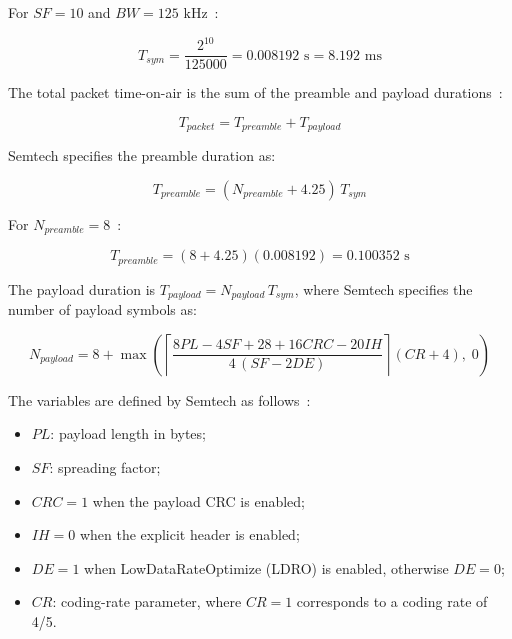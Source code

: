 For \(SF = 10\) and \(BW = 125\text{ kHz}\)~\cite{semtech2020sx1276}:

\begin{equation}
T_{sym} = \frac{2^{10}}{125000} = 0.008192\text{ s} = 8.192\text{ ms}
\label{eq:symbol-time-value}
\end{equation}

The total packet time-on-air is the sum of the preamble and payload durations~\cite[Sec.~4.1.1.7, p.~31]{semtech2020sx1276}:

\begin{equation}
T_{packet} = T_{preamble} + T_{payload}
\label{eq:packet-airtime}
\end{equation}

Semtech specifies the preamble duration as:

\begin{equation}
T_{preamble} = (N_{preamble} + 4.25)\,T_{sym}
\label{eq:preamble-duration}
\end{equation}

For \(N_{preamble} = 8\)~\cite{semtech2020sx1276}:

\begin{equation}
T_{preamble} = (8 + 4.25)(0.008192) = 0.100352\text{ s}
\label{eq:preamble-value}
\end{equation}

The payload duration is \(T_{payload} = N_{payload}\,T_{sym}\), where Semtech specifies the number of payload symbols as:

\begin{equation}
N_{payload} = 8 + \max\left( \left\lceil \frac{8PL - 4SF + 28 + 16CRC - 20IH}{4\,(SF - 2DE)} \right\rceil (CR + 4),\; 0 \right)
\label{eq:payload-symbols}
\end{equation}

The variables are defined by Semtech as follows~\cite[Secs.~4.1.1.5--4.1.1.7, pp.~28--31]{semtech2020sx1276}:

\begin{itemize}
\item \(PL\): payload length in bytes;
\item \(SF\): spreading factor;
\item \(CRC = 1\) when the payload CRC is enabled;
\item \(IH = 0\) when the explicit header is enabled;
\item \(DE = 1\) when LowDataRateOptimize (LDRO) is enabled, otherwise \(DE = 0\);
\item \(CR\): coding-rate parameter, where \(CR = 1\) corresponds to a coding rate of 4/5.
\end{itemize}

